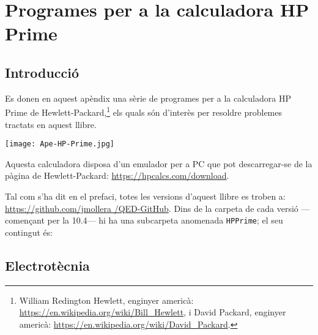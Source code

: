 \chapter{Programes per a la calculadora \textsf{HP Prime}}\label{sec:progs-HP}

\section{Introducció}\label{sec:HPPrime-Intro}

\lstset{
	language=HPPRIME,
	numbers=left,
	frame=lines
}

Es donen en aquest apèndix una sèrie de programes per a la calculadora \textsf{HP Prime} de Hewlett-Packard,\footnote{William Redington Hewlett, enginyer americà: \href{https://en.wikipedia.org/wiki/Bill_Hewlett}{https:/\!\!/en.wikipedia.org/wiki/Bill\_Hewlett}, i David Packard, enginyer americà: \href{https://en.wikipedia.org/wiki/David_Packard}{https:/\!\!/en.wikipedia.org/wiki/David\_Packard}.} els quals són d'interès per resoldre problemes tractats en aquest llibre.

\begin{center}
\texttt{[image: Ape-HP-Prime.jpg]}
\end{center}

Aquesta calculadora disposa d'un emulador per a PC que pot descarregar-se de la pàgina de Hewlett-Packard: \href{https://hpcalcs.com/download/}{https:/\!\!/hpcalcs.com/download}.

Tal com s'ha dit en el prefaci, totes les versions d'aquest llibre es troben a:
\href{https://github.com/jmollera/QED-GitHub}{https:/\!\!/github.com/jmollera
	/QED-GitHub}.  Dins de la carpeta de cada versió ---començant per la 10.4--- hi ha una subcarpeta anomenada \texttt{HPPrime}; el seu contingut és: 

	
\section{Electrotècnia}\label{sec:HP_ELC}

